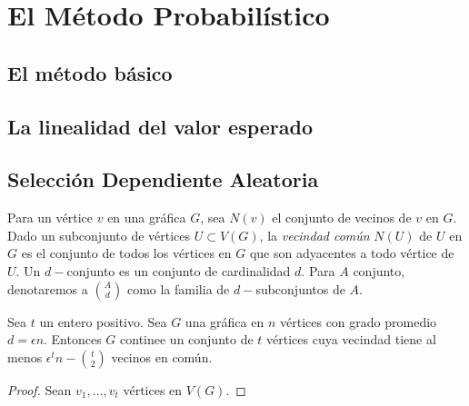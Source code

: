 

\chapter{El Método Probabilístico}

\section{El método básico}

\section{La linealidad del valor esperado}

\section{Selección Dependiente Aleatoria}
Para un vértice $v$ en una gráfica $G$, sea $N(v)$ el conjunto de
vecinos de $v$ en $G$. Dado un subconjunto de vértices $U \subset
V(G)$, la \textit{vecindad común} $N(U)$ de $U$ en $G$ es el conjunto
de todos los vértices en $G$ que son adyacentes a todo vértice de $U$.
Un $d-$conjunto es un conjunto de cardinalidad $d$. Para $A$
conjunto, denotaremos a $\binom{A}{d}$ como la familia de
$d-$subconjuntos de $A$.

\begin{theorem}
  Sea $t$ un entero positivo. Sea $G$ una gráfica en $n$ vértices con
  grado promedio $d = \epsilon n$.
  Entonces $G$ continee un conjunto de $t$ vértices cuya vecindad
  tiene al menos $\epsilon^t n - \binom{t}{2}$ vecinos en común.
\end{theorem}
\begin{proof}
    Sean $v_1, \ldots, v_t$ vértices en $V(G)$.

\end{proof}

